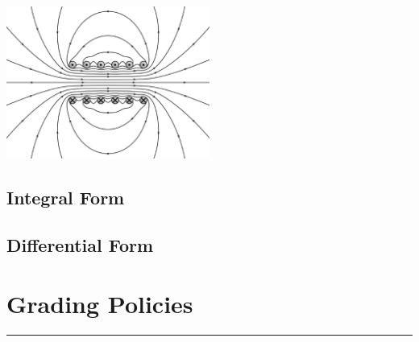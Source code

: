 \documentclass[letterpaper,10pt,titlepage]{article}
\begin{document}
\begin{center}
    \includegraphics[width=0.5\textwidth]{maxwell.eps}
\end{center}

\subsection*{Integral Form}

\subsection*{Differential Form}

\newpage

\section*{Grading Policies}
\hrule
\end{document}
